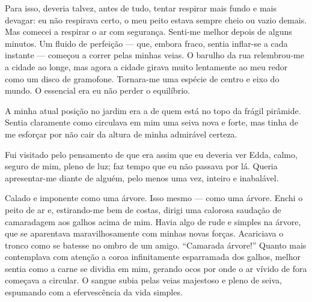 Para isso, deveria talvez, antes de tudo, tentar respirar mais fundo e mais
devagar: eu não respirava certo, o meu peito estava sempre cheio ou vazio
demais. Mas comecei a respirar o ar com segurança. Senti-me melhor depois de
alguns minutos. Um fluido de perfeição --- que, embora fraco, sentia
inflar-se a cada instante --- começou a correr pelas minhas veias. O barulho
da rua relembrou-me a cidade ao longe, mas agora a cidade girava muito
lentamente ao meu redor como um disco de gramofone. Tornara-me uma espécie de
centro e eixo do mundo. O essencial era eu não perder o equilíbrio.


A minha atual posição no jardim era a de quem está no topo da frágil pirâmide.
Sentia claramente como circulava em mim uma seiva nova e forte, mas tinha de
me esforçar por não cair da altura de minha admirável certeza.

Fui visitado pelo pensamento de que era assim que eu deveria ver Edda, calmo,
seguro de mim, pleno de luz; faz tempo que eu não passava por lá. Queria
apresentar-me diante de alguém, pelo menos uma vez, inteiro e inabalável.

Calado e imponente como uma árvore. Isso mesmo --- como uma árvore. Enchi o
peito de ar e, estirando-me bem de costas, dirigi uma calorosa saudação de
camaradagem aos galhos acima de mim. Havia algo de rude e simples na árvore,
que se aparentava maravilhosamente com minhas novas forças. Acariciava o
tronco como se batesse no ombro de um amigo. ``Camarada árvore!'' Quanto mais
contemplava com atenção a coroa infinitamente esparramada dos galhos, melhor
sentia como a carne se dividia em mim, gerando ocos por onde o ar vívido de
fora começava a circular. O sangue subia pelas veias majestoso e pleno de
seiva, espumando com a efervescência da vida simples.

